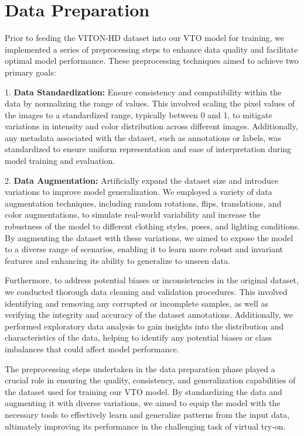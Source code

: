 \section{Data Preparation}

Prior to feeding the VITON-HD dataset into our VTO model for training, we implemented a series of preprocessing steps to enhance data quality and facilitate optimal model performance. These preprocessing techniques aimed to achieve two primary goals:

1. \textbf{Data Standardization:} Ensure consistency and compatibility within the data by normalizing the range of values. This involved scaling the pixel values of the images to a standardized range, typically between 0 and 1, to mitigate variations in intensity and color distribution across different images. Additionally, any metadata associated with the dataset, such as annotations or labels, was standardized to ensure uniform representation and ease of interpretation during model training and evaluation.

2. \textbf{Data Augmentation:} Artificially expand the dataset size and introduce variations to improve model generalization. We employed a variety of data augmentation techniques, including random rotations, flips, translations, and color augmentations, to simulate real-world variability and increase the robustness of the model to different clothing styles, poses, and lighting conditions. By augmenting the dataset with these variations, we aimed to expose the model to a diverse range of scenarios, enabling it to learn more robust and invariant features and enhancing its ability to generalize to unseen data.

Furthermore, to address potential biases or inconsistencies in the original dataset, we conducted thorough data cleaning and validation procedures. This involved identifying and removing any corrupted or incomplete samples, as well as verifying the integrity and accuracy of the dataset annotations. Additionally, we performed exploratory data analysis to gain insights into the distribution and characteristics of the data, helping to identify any potential biases or class imbalances that could affect model performance.

The preprocessing steps undertaken in the data preparation phase played a crucial role in ensuring the quality, consistency, and generalization capabilities of the dataset used for training our VTO model. By standardizing the data and augmenting it with diverse variations, we aimed to equip the model with the necessary tools to effectively learn and generalize patterns from the input data, ultimately improving its performance in the challenging task of virtual try-on.


